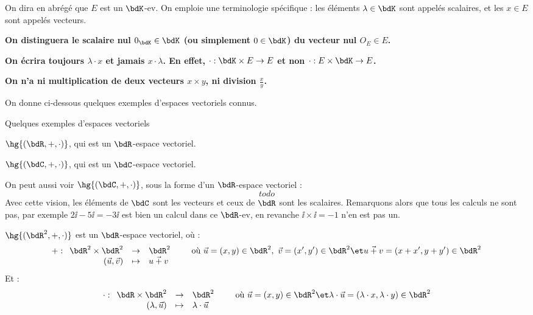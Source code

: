 \documentclass[a4paper,french,bookmarks]{article}
\begin{document}
On dira en abrégé que $E$ est un $\bdK$-ev. On emploie une terminologie spécifique : les éléments $\lambda \in \bdK$ sont appelés scalaires, et les $x \in E$ sont appelés vecteurs. 

\begin{warning}{}{}
    \begin{enumerate}
        \ithand \bf{On distinguera le scalaire nul $0_\bdK \in \bdK$} (ou simplement $0 \in \bdK$) \bf{du vecteur nul $O_E \in E$}.
        
        \ithand \bf{On écrira toujours $\lambda \cdot x$ et jamais $x \cdot \lambda$}. En effet, $\cdot : \bdK \times E \to E$ et non $\cdot : E \times \bdK \to E$.
        
        \ithand \bf{On n'a ni multiplication de deux vecteurs $x \times y$, ni division $\frac{x}{y}$}. 
    \end{enumerate}
\end{warning}

On donne ci-dessous quelques exemples d'espaces vectoriels connus.

\begin{example}{Quelques exemples d'espaces vectoriels}{}
    \begin{enumerate}
        \ithand \(\hg{(\bdR, +, \cdot)}\), qui est un \(\bdR\)-espace vectoriel.
        
        \ithand \(\hg{(\bdC, +, \cdot)}\), qui est un \(\bdC\)-espace vectoriel.
        
        \ithand On peut aussi voir \(\hg{(\bdC, +, \cdot)}\), sous la forme d'un \(\bdR\)-espace vectoriel :
        \[ todo \]
        Avec cette vision, les éléments de $\bdC$ sont les vecteurs et ceux de $\bdR$ sont les scalaires. Remarquons alors que tous les calculs ne sont pas, par exemple $2\ii - 5\ii = -3\ii$ est bien un calcul dans ce $\bdR$-ev, en revanche $\ii \times \ii = -1$ n'en est pas un.
        
        \ithand \(\hg{(\bdR^2, +, \cdot)}\) est un $\bdR$-espace vectoriel, où :
        \[ + : \begin{array}[t]{rcl}
            \bdR^2 \times \bdR^2 &\to& \bdR^2  \\
            (\vec u, \vec v) &\mapsto& \vec{u + v}
        \end{array} \qquad\text{où} \ \vec u = (x, y) \in \bdR^2,\ \vec v = (x', y') \in \bdR^2 \et \vec{u + v} = (x + x', y + y') \in \bdR^2\]
        Et :
        \[ \cdot : \begin{array}[t]{rcl}
            \bdR \times \bdR^2 &\to& \bdR^2  \\
            (\lambda, \vec u) &\mapsto& \lambda \cdot \vec{u}
        \end{array} \qquad\text{où} \ \vec u = (x, y) \in \bdR^2 \et \lambda \cdot \vec{u} = (\lambda \cdot x, \lambda \cdot y) \in \bdR^2\]
    \end{enumerate}
\end{example}
\end{document}
